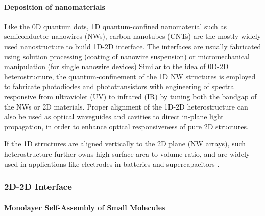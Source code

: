 \paragraph{Deposition of nano\-materials}
Like the 0D quantum dots, 1D quantum-confined nano\-material such as
semiconductor nanowires (NWs), carbon nano\-tubes (CNTs) are the
mostly widely used nano\-structure to build 1D-2D interface.
%
The interfaces are usually fabricated using solution processing
(coating of nanowire suspension) or micro\-mechanical manipulation
(for single nanowire devices)
%
Similar to the idea of 0D-2D heterostructure, the quantum-confinement
of the 1D NW structures is employed to fabricate photo\-diodes and
photo\-transistors with engineering of spectra responsive from
ultraviolet (UV) to infrared (IR)  by tuning both the bandgap of the NWs or 2D materials.
%
Proper alignment of the 1D-2D heterostructure can also be used as
optical waveguides and cavities to direct in-plane light propagation,
in order to enhance optical responsiveness of pure 2D structures.

If the 1D structures are aligned vertically to the 2D plane (\ie NW
arrays), such heterostructure further owns high surface-area-to-volume
ratio, and are widely used in applications like electrodes in
batteries and super\-capacitors .



\subsubsection{2D-2D Interface}
\label{sec:intro-2D-2D}

\paragraph{Monolayer Self-Assembly of Small Molecules}
\label{sec:orgfd77377}

